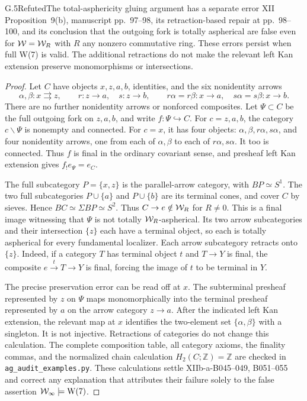 \begin{claim}{G.5}{Refuted}{The total-asphericity gluing argument has a separate error}
XII Proposition~9(b), manuscript pp.~97--98, its retraction-based repair at pp.~98--100, and its conclusion that the outgoing fork is totally aspherical are false even for $\mathcal{W}=\mathcal{W}_R$ with $R$ any nonzero commutative ring. These errors persist when full W(7) is valid. The additional retractions do not make the relevant left Kan extension preserve monomorphisms or intersections.
\end{claim}
\begin{proof}
Let $C$ have objects $x,z,a,b$, identities, and the six nonidentity arrows
\[
\alpha,\beta:x\rightrightarrows z,\qquad
r:z\to a,\quad s:z\to b,\qquad
r\alpha=r\beta:x\to a,\quad s\alpha=s\beta:x\to b.
\]
There are no further nonidentity arrows or nonforced composites. Let $\Psi\subset C$ be the full outgoing fork on $z,a,b$, and write $f:\Psi\hookrightarrow C$. For $c=z,a,b$, the category $c\backslash\Psi$ is nonempty and connected. For $c=x$, it has four objects: $\alpha,\beta,r\alpha,s\alpha$, and four nonidentity arrows, one from each of $\alpha,\beta$ to each of $r\alpha,s\alpha$. It too is connected. Thus $f$ is final in the ordinary covariant sense, and presheaf left Kan extension gives $f_!e_\Psi=e_C$.

The full subcategory $P=\{x,z\}$ is the parallel-arrow category, with $BP\simeq S^1$. The two full subcategories $P\cup\{a\}$ and $P\cup\{b\}$ are its terminal cones, and cover $C$ by sieves. Hence $BC\simeq\Sigma BP\simeq S^2$. Thus $C\to e\notin\mathcal{W}_R$ for $R\ne0$. This is a final image witnessing that $\Psi$ is not totally $\mathcal{W}_R$-aspherical. Its two arrow subcategories and their intersection $\{z\}$ each have a terminal object, so each is totally aspherical for every fundamental localizer. Each arrow subcategory retracts onto $\{z\}$. Indeed, if a category $T$ has terminal object $t$ and $T\to Y$ is final, the composite $e\xrightarrow{t}T\to Y$ is final, forcing the image of $t$ to be terminal in $Y$.

The precise preservation error can be read off at $x$. The subterminal presheaf represented by $z$ on $\Psi$ maps monomorphically into the terminal presheaf represented by $a$ on the arrow category $z\to a$. After the indicated left Kan extension, the relevant map at $x$ identifies the two-element set $\{\alpha,\beta\}$ with a singleton. It is not injective. Retractions of categories do not change this calculation. The complete composition table, all category axioms, the finality commas, and the normalized chain calculation $H_2(C;\mathbb Z)=\mathbb Z$ are checked in \texttt{ag\_audit\_examples.py}. These calculations settle XIIb-a-B045--049, B051--055 and correct any explanation that attributes their failure solely to the false assertion $\mathcal{W}_{\infty}\models\mathrm W(7)$.
\end{proof}

